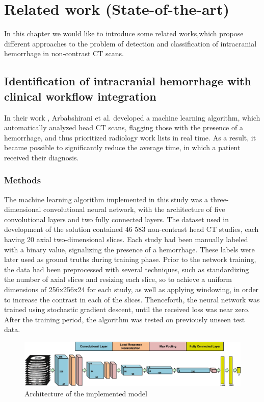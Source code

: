 \chapter{Related work (State-of-the-art)}
In this chapter we would like to introduce some related works,which propose different approaches to the problem of detection and classification of intracranial hemorrhage in non-contrast CT scans.

\section{Identification of intracranial hemorrhage with clinical workflow integration}
In their work \cite{relatedWork1}, Arbabshirani et al. developed a machine learning algorithm, which automatically analyzed head CT scans, flagging those with the presence of a hemorrhage, and thus prioritized radiology work lists in real time. As a result, it became possible to significantly reduce the average time, in which a patient received their diagnosis.  
\subsection*{Methods} 
The machine learning algorithm implemented in this study was a three-dimensional convolutional neural network, with the architecture of five convolutional layers and two fully connected layers. The dataset used in development of the solution contained 46 583 non-contrast head CT studies, each having 20 axial two-dimensional slices. Each study had been manually labeled with a binary value, signalizing the presence of a hemorrhage. These labels were later used as ground truths during training phase. Prior to the network training, the data had been preprocessed with several techniques, such as standardizing the number of axial slices and resizing each slice, so to achieve a uniform dimensions of 256x256x24 for each study, as well as applying windowing, in order to increase the contrast in each of the slices. Thenceforth, the neural network was trained using stochastic gradient descent, until the received loss was near zero. After the training period, the algorithm was tested on previously unseen test data.
\begin{figure}[!ht]
\begin{centering}
\includegraphics[width=16cm]{assets/images/RW1-net-arch.png}
\par\end{centering}
\caption[Architecture of the implemented model]{Architecture of the implemented model  \label{fig:rw1}}
\end{figure}
